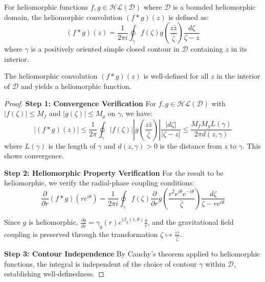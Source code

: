 \begin{definition}
For heliomorphic functions $f, g \in \mathcal{HL}(\mathcal{D})$ where $\mathcal{D}$ is a bounded heliomorphic domain, the heliomorphic convolution $(f * g)(z)$ is defined as:
\begin{equation}
(f * g)(z) = \frac{1}{2\pi i} \oint_{\gamma} f(\zeta) g\left(\frac{z\bar{z}}{\bar{\zeta}}\right) \frac{d\zeta}{\zeta - z}
\end{equation}
where $\gamma$ is a positively oriented simple closed contour in $\mathcal{D}$ containing $z$ in its interior.
\end{definition}

\begin{theorem}
\label{thm:heliomorphic_convolution_welldef}
The heliomorphic convolution $(f * g)(z)$ is well-defined for all $z$ in the interior of $\mathcal{D}$ and yields a heliomorphic function.
\end{theorem}

\begin{proof}
\textbf{Step 1: Convergence Verification}
For $f, g \in \mathcal{HL}(\mathcal{D})$ with $|f(\zeta)| \leq M_f$ and $|g(\zeta)| \leq M_g$ on $\gamma$, we have:
$$\left|(f * g)(z)\right| \leq \frac{1}{2\pi} \oint_{\gamma} |f(\zeta)| \left|g\left(\frac{z\bar{z}}{\bar{\zeta}}\right)\right| \frac{|d\zeta|}{|\zeta - z|} \leq \frac{M_f M_g L(\gamma)}{2\pi d(z,\gamma)}$$
where $L(\gamma)$ is the length of $\gamma$ and $d(z,\gamma) > 0$ is the distance from $z$ to $\gamma$. This shows convergence.

\textbf{Step 2: Heliomorphic Property Verification}
For the result to be heliomorphic, we verify the radial-phase coupling conditions:
$$\frac{\partial}{\partial r}(f * g)(re^{i\theta}) = \frac{1}{2\pi i} \oint_{\gamma} f(\zeta) \frac{\partial}{\partial r}g\left(\frac{r^2 e^{i\theta} e^{-i\theta}}{\bar{\zeta}}\right) \frac{d\zeta}{\zeta - re^{i\theta}}$$

Since $g$ is heliomorphic, $\frac{\partial g}{\partial r} = \gamma_g(r)e^{i\beta_g(r,\theta)}\frac{g}{r}$, and the gravitational field coupling is preserved through the transformation $\zeta \mapsto \frac{z\bar{z}}{\bar{\zeta}}$.

\textbf{Step 3: Contour Independence}
By Cauchy's theorem applied to heliomorphic functions, the integral is independent of the choice of contour $\gamma$ within $\mathcal{D}$, establishing well-definedness.
\end{proof}

